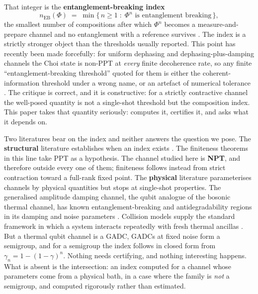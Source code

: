 \documentclass[11pt,a4paper]{article}
\theoremstyle{definition}
\theoremstyle{remark}
\newcommand{\nEB}{n_{\mathrm{EB}}}
\begin{document}
That integer is the \textbf{entanglement-breaking index} \cite{LG2015}
\begin{equation}\label{eq:neb}
  \nEB(\Phi) \;=\; \min\{\, n \ge 1 \;:\; \Phi^{n} \text{ is entanglement breaking} \,\},
\end{equation}
the smallest number of compositions after which $\Phi^n$ becomes a
measure-and-prepare channel and no entanglement with a reference survives
\cite{HSR2003}. The index is a strictly stronger object than the thresholds
usually reported. This point has recently been made forcefully: for uniform
dephasing and dephasing-plus-damping channels the Choi state is non-PPT at
\emph{every} finite decoherence rate, so any finite ``entanglement-breaking
threshold'' quoted for them is either the coherent-information threshold under
a wrong name, or an artefact of numerical tolerance \cite{NoThreshold}. The
critique is correct, and it is constructive: for a strictly contractive
channel the well-posed quantity is not a single-shot threshold but the
composition index. This paper takes that quantity seriously: computes it,
certifies it, and asks what it depends on.

Two literatures bear on the index and neither answers the question we pose.
The \textbf{structural} literature establishes when an index exists
\cite{RJP2018,HRF2020,CMW2019,Park2026}. The finiteness theorems in this line
take PPT as a hypothesis. The channel studied here is \textbf{NPT}, and
therefore outside every one of them; finiteness follows instead from strict
contraction toward a full-rank fixed point. The \textbf{physical} literature
parameterises channels by physical quantities but stops at single-shot
properties. The generalised amplitude damping channel, the qubit analogue of
the bosonic thermal channel, has known entanglement-breaking and
antidegradability regions in its damping and noise parameters \cite{KSW2020}.
Collision models supply the standard framework in which a system interacts
repeatedly with fresh thermal ancillas \cite{Ciccarello2022}. But a thermal
qubit channel is a GADC, GADCs at fixed noise form a semigroup, and for a
semigroup the index follows in closed form from $\gamma_n = 1-(1-\gamma)^n$.
Nothing needs certifying, and nothing interesting happens. What is absent is
the intersection: an index computed for a channel whose parameters come from a
physical bath, in a case where the family is \emph{not} a semigroup, and
computed rigorously rather than estimated.
\end{document}
